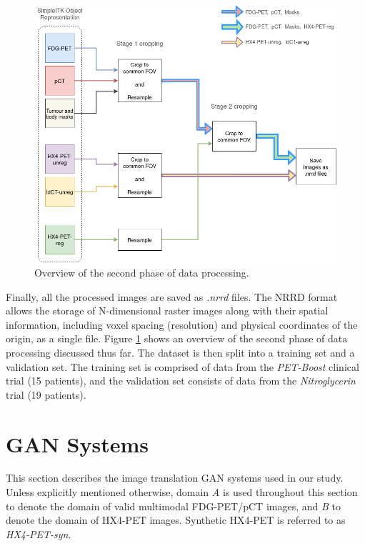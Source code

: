 \begin{figure}[h!]
    \centering
    \includegraphics[width=0.8\linewidth]{figures/Data/data_processing_overview-step_2.png}
    \caption{Overview of the second phase of data processing.}
    \label{fig:data_proc_overview_2}
\end{figure}

Finally, all the processed images are saved as \textit{.nrrd} files. The NRRD format allows the storage of N-dimensional raster images along with their spatial information, including voxel spacing (resolution) and physical coordinates of the origin, as a single file. Figure \ref{fig:data_proc_overview_2} shows an overview of the second phase of data processing discussed thus far. The dataset is then split into a training set and a validation set. The training set is comprised of data from the \textit{PET-Boost} clinical trial (15 patients), and the validation set consists of data from the \textit{Nitroglycerin} trial (19 patients). 



\section{GAN Systems}
\label{GAN_Systems}
This section describes the image translation GAN systems used in our study. Unless explicitly mentioned otherwise, domain \textit{A} is used throughout this section to denote the domain of valid multimodal FDG-PET/pCT images, and \textit{B} to denote the domain of HX4-PET images. Synthetic HX4-PET is referred to as \textit{HX4-PET-syn}.


